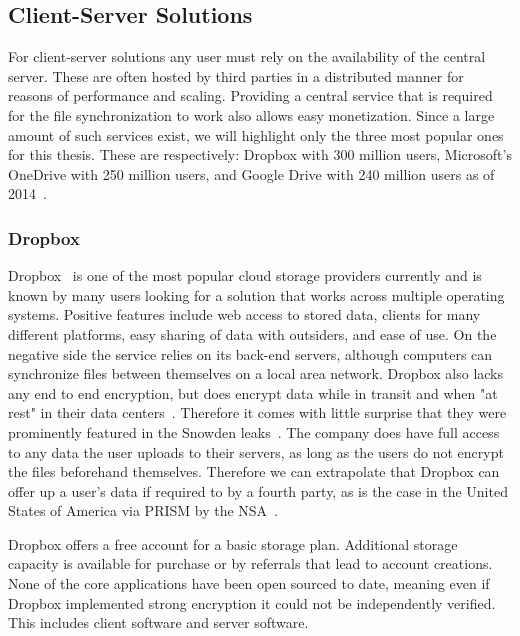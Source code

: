 \subsection{Client-Server Solutions}
\label{sub:Client-Server Solutions}

For client-server solutions any user must rely on the availability of the central server.
These are often hosted by third parties in a distributed manner for reasons of performance and scaling.
Providing a central service that is required for the file synchronization to work also allows easy monetization.
Since a large amount of such services exist, we will highlight only the three most popular ones for this thesis.
These are respectively: Dropbox with 300 million users, Microsoft's OneDrive with 250 million users, and Google Drive with 240 million users as of 2014~\cite{web:site:fortune}.

\subsubsection{Dropbox}
\label{subs:Dropbox}

Dropbox~\cite{web:site:dropbox} is one of the most popular cloud storage providers currently and is known by many users looking for a solution that works across multiple operating systems.
Positive features include web access to stored data, clients for many different platforms, easy sharing of data with outsiders, and ease of use.
On the negative side the service relies on its back-end servers, although computers can synchronize files between themselves on a local area network.
Dropbox also lacks any end to end encryption, but does encrypt data while in transit and when "at rest" in their data centers~\cite{web:site:dropbox:blog}.
Therefore it comes with little surprise that they were prominently featured in the Snowden leaks~\cite{web:site:rt:dropbox}.
The company does have full access to any data the user uploads to their servers, as long as the users do not encrypt the files beforehand themselves.
Therefore we can extrapolate that Dropbox can offer up a user's data if required to by a fourth party, as is the case in the United States of America via PRISM by the NSA~\cite{web:site:wp:internet_giants}.

Dropbox offers a free account for a basic storage plan.
Additional storage capacity is available for purchase or by referrals that lead to account creations.
None of the core applications have been open sourced to date, meaning even if Dropbox implemented strong encryption it could not be independently verified.
This includes client software and server software.

